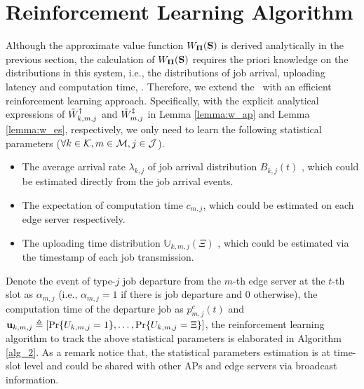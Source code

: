 \section{Reinforcement Learning Algorithm}
\label{sec:rl-alg}
{
    Although the approximate value function $W_{\boldsymbol{\Pi}}(\mathbf{S})$ is derived analytically in the previous section, the calculation of $ W_{\boldsymbol{\Pi}}(\mathbf{S})$ requires the priori knowledge on the distributions in this system, i.e., the distributions of job arrival, uploading latency and computation time, . %
    Therefore, we extend the \algname~with an efficient reinforcement learning approach.
    Specifically, with the explicit analytical expressions of $\tilde{W}^{\dagger}_{k,m,j}$ and $\tilde{W}^{\ddagger}_{m,j}$ in Lemma \ref{lemma:w_ap} and Lemma \ref{lemma:w_es}, respectively, we only need to learn the following statistical parameters ($\forall k\in\mathcal{K},m\in\mathcal{M}, j\in\mathcal{J}$).
    \begin{itemize}
        \item The average arrival rate $\lambda_{k,j}$ of job arrival distribution $B_{k,j}(t)$ , which could be estimated directly from the job arrival events.
        \item The expectation of computation time $c_{m,j}$, which could be estimated on each edge server respectively.
        \item The uploading time distribution $\mathbb{U}_{k,m,j}(\Xi)$ , which could be estimated via the timestamp of each job transmission.
    \end{itemize}
    Denote the event of type-$j$ job departure from the $m$-th edge server at the $t$-th slot as $\alpha_{m,j}$ (i.e., $\alpha_{m,j}=1$ if there is job departure and $0$ otherwise), the computation time of the departure job as $p^{c}_{m,j}(t)$ and $\mathbf{u}_{k,m,j} \triangleq [\Pr\{U_{k,m,j}=1\}, \dots, \Pr\{U_{k,m,j}=\Xi\}]$, the reinforcement learning algorithm to track the above statistical parameters is elaborated in Algorithm \ref{alg_2}.
    As a remark notice that, the statistical parameters estimation is at time-slot level and could be shared with other APs and edge servers via broadcast information.
}%

